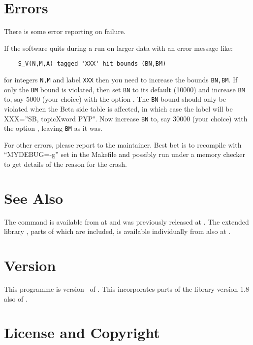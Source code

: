 \documentclass[a4paper,english]{article}
\begin{document}
\section{Errors}

There is some error reporting on failure.

If the software quits during a run on larger data with an
error message like:
\begin{verbatim}
    S_V(N,M,A) tagged 'XXX' hit bounds (BN,BM)
\end{verbatim}
for integers \texttt{N,M} and label \texttt{XXX} then you
need to increase the bounds \texttt{BN,BM}.
If only the \texttt{BM} bound is violated,
then set \texttt{BN} to its default (10000) and increase
\texttt{BM} to, say 5000 (your choice) with the
option .
The \texttt{BN} bound should only be violated
when the Beta side table is affected,
in which case the label will be
XXX=''SB, topicXword PYP".
Now increase \texttt{BN} to, say 30000 (your choice) with the
option ,
leaving \texttt{BM} as it was.

For other errors, please report to the maintainer.
Best bet is to recompile 
with ``MYDEBUG=-g'' set in the Makefile
and possibly run under a memory checker to get details of
the reason for the crash.

\section{See Also}

The command  is available from   at
and was previously released at .
The extended library , parts of which are included, is available
individually from  also at
 .


\section{Version}

This programme is version \Version\ of \Date.
This incorporates parts of the library  version 1.8
also of \Date.

\section{License and Copyright}
\end{document}
